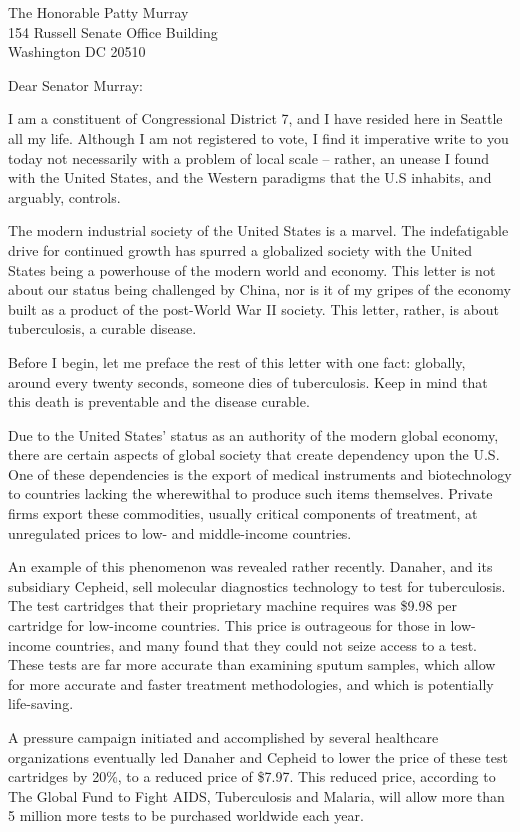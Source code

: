 \documentclass[10pt]{letter}
\begin{document}
\begin{letter}
{
    The Honorable Patty Murray\\
    154 Russell Senate Office Building\\
    Washington DC 20510
}

\opening{Dear Senator Murray:}

I am a constituent of Congressional District 7, and I have resided here in
Seattle all my life. Although I am not registered to vote, I find it imperative
write to you today not necessarily with a problem of local scale -- rather, an
unease I found with the United States, and the Western paradigms that the U.S
inhabits, and arguably, controls.

The modern industrial society of the United States is a marvel. The
indefatigable drive for continued growth has spurred a globalized society with
the United States being a powerhouse of the modern world and economy. This
letter is not about our status being challenged by China, nor is it of my gripes
of the economy built as a product of the post-World War II society. This letter,
rather, is about tuberculosis, a curable disease. 

Before I begin, let me preface the rest of this letter with one fact: globally,
around every twenty seconds, someone dies of tuberculosis. Keep in mind that
this death is preventable and the disease curable.

Due to the United States' status as an authority of the modern global economy,
there are certain aspects of global society that create dependency upon the
U.S. One of these dependencies is the export of medical instruments and
biotechnology to countries lacking the wherewithal to produce such items
themselves. Private firms export these commodities, usually critical components
of treatment, at unregulated prices to low- and middle-income countries.

An example of this phenomenon was revealed rather recently. Danaher, and its
subsidiary Cepheid, sell molecular diagnostics technology to test for
tuberculosis. The test cartridges that their proprietary machine requires was
\$9.98 per cartridge for low-income countries. This price is outrageous for
those in low-income countries, and many found that they could not seize access
to a test. These tests are far more accurate than examining sputum samples,
which allow for more accurate and faster treatment methodologies, and which is
potentially life-saving.

A pressure campaign initiated and accomplished by several healthcare
organizations eventually led Danaher and Cepheid to lower the price of these
test cartridges by 20\%, to a reduced price of \$7.97. This reduced price,
according to The Global Fund to Fight AIDS, Tuberculosis and Malaria, will allow
more than 5 million more tests to be purchased worldwide each year.


\end{letter}
\end{document}
